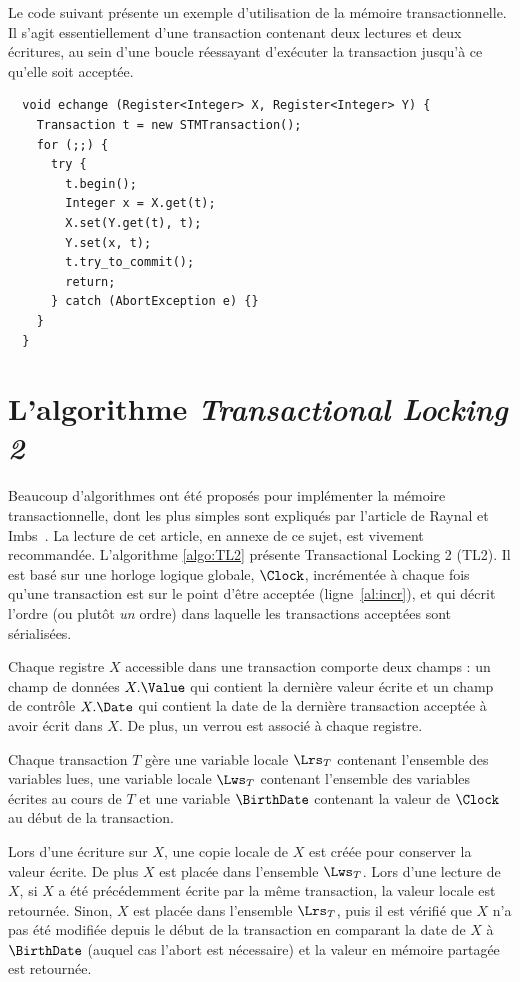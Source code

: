 \documentclass{td}
\begin{document}
Le code suivant présente un exemple d'utilisation de la mémoire transactionnelle.
Il s'agit essentiellement d'une transaction contenant deux lectures et deux écritures,
au sein d'une boucle réessayant d'exécuter la transaction jusqu'à ce qu'elle soit acceptée.

\begin{lstlisting}
  void echange (Register<Integer> X, Register<Integer> Y) {
    Transaction t = new STMTransaction();
    for (;;) {
      try {
        t.begin();
        Integer x = X.get(t);
        X.set(Y.get(t), t);
        Y.set(x, t);
        t.try_to_commit();
        return;
      } catch (AbortException e) {}
    }
  }
\end{lstlisting}


\section{L'algorithme \emph{Transactional Locking 2}}

Beaucoup d'algorithmes ont été proposés pour implémenter la mémoire transactionnelle, dont les plus simples
sont expliqués par l'article de Raynal et Imbs~\cite{IR}. La lecture de cet article,
en annexe de ce sujet, est vivement recommandée.
L'algorithme \ref{algo:TL2} présente Transactional Locking 2 (TL2).
Il est basé sur une horloge logique globale, $\Clock$,
incrémentée à chaque fois qu'une transaction
est sur le point d'être acceptée (ligne~\ref{al:incr}), et qui décrit l'ordre (ou plutôt \emph{un} ordre)
dans laquelle les transactions acceptées sont sérialisées.

Chaque registre $X$ accessible dans une transaction comporte deux champs : un champ de données
$X.\Value$ qui contient la dernière valeur écrite et un champ de contrôle $X.\Date$ qui
contient la date de la dernière transaction acceptée à avoir écrit dans $X$.
De plus, un verrou est associé à chaque registre.

Chaque transaction $T$ gère une variable locale $\Lrs_T$ contenant l'ensemble des variables lues,
une variable locale $\Lws_T$ contenant l'ensemble des variables écrites au cours de $T$
et une variable $\BirthDate$ contenant la valeur de $\Clock$ au début de la transaction.

Lors d'une écriture sur $X$, une copie locale de $X$ est créée pour conserver la valeur écrite.
De plus $X$ est placée dans l'ensemble $\Lws_T$.
Lors d'une lecture de $X$, si $X$ a été précédemment écrite par la même transaction,
la valeur locale est retournée. Sinon, $X$ est placée dans l'ensemble $\Lrs_T$,
puis il est vérifié que $X$ n'a pas été modifiée depuis le début de la transaction
en comparant la date de $X$ à $\BirthDate$
(auquel cas l'abort est nécessaire) et la valeur en mémoire partagée est retournée.
\end{document}
